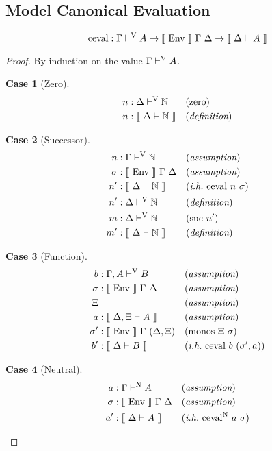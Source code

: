 \documentclass{llncs}
\newtheorem{scase}{Case}
\def\marr{\rightarrow}
\def\nat{\mathbb{N}}
\def\zero{\con{zero}}
\def\suc{\con{suc}}
\def\monos{\fun{monos}}
\def\cevalv{\fun{ceval}}
\def\cevaln{\fun{ceval}^\con{N}}
\def\bydef{(\textit{definition})}
\def\byass{(\textit{assumption})}
\newcommand{\ih}[1]{(\textit{i.h.}~ #1)}
\newcommand{\by}[1]{(#1)}
\newcommand{\turn}[1]{\vdash^\con{#1}}
\newcommand{\el}[1]{\llbracket ~ #1 ~ \rrbracket}
\newcommand{\con}[1]{\textmd{#1}}
\newcommand{\fun}[1]{\textmd{#1}}
\newcommand{\dtypm}[1]{\el{\Delta \vdash #1}}
\newcommand{\typv}[1]{\Gamma \turn{V} #1}
\newcommand{\dtypv}[1]{\Delta \turn{V} #1}
\newcommand{\gatypv}[1]{\Gamma, A \turn{V} #1}
\newcommand{\typn}[1]{\Gamma \turn{N} #1}
\def\menv{\el{\fun{Env}}~\Gamma~\Delta}
\newcommand{\gmenv}[1]{\el{\fun{Env}}~\Gamma~#1}
\begin{document}
\subsection{Model Canonical Evaluation}

\begin{theorem}
\label{thm:mod:cevalv}
$$
\cevalv : \typv{A} \marr \menv \marr \dtypm{A}
$$
\end{theorem}

\begin{proof}

By induction on the value $\typv{A}$.

\begin{scase}[Zero]
\begin{align*}
n  &: \dtypv{\nat} && \by{\zero}\\
n  &: \dtypm{\nat} && \bydef
\end{align*}
\end{scase}

\begin{scase}[Successor]
\begin{align*}
n   &: \typv{\nat} && \byass\\
\sigma  &: \menv && \byass\\
n'  &: \dtypm{\nat} && \ih{\cevalv~n~\sigma}\\
n'  &: \dtypv{\nat} && \bydef\\
m   &: \dtypv{\nat} && \by{\suc~n'}\\
m'  &: \dtypm{\nat} && \bydef
\end{align*}
\end{scase}

\begin{scase}[Function]
\begin{align*}
b   &: \gatypv{B} && \byass\\
\sigma  &: \menv && \byass\\
\Xi& && \byass\\
a   &: \el{\Delta, \Xi \vdash A} && \byass\\
\sigma'  &: \gmenv{(\Delta, \Xi)} && \by{\monos~\Xi~\sigma}\\
b'  &: \dtypm{B} && \ih{\cevalv~b~(\sigma', a)}\\
\end{align*}
\end{scase}

\begin{scase}[Neutral]
\begin{align*}
a   &: \typn{A} && \byass\\
\sigma  &: \menv && \byass\\
a'  &: \dtypm{A} && \ih{\cevaln~a~\sigma}
\end{align*}
\end{scase}


\end{proof}
\end{document}
